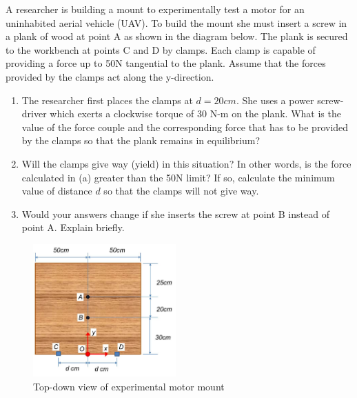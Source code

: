 
A researcher is building a mount to experimentally test a motor for an uninhabited aerial vehicle (UAV).
To build the mount she must insert a screw in a plank of wood at point A as shown in the diagram 
below. The plank is secured to the workbench at points C and D by clamps. Each clamp is capable of
providing a force up to 50N tangential to the plank. Assume that the forces provided by the clamps act along
the y-direction.

\begin{enumerate}
  \item The researcher first places the clamps at $d = 20 cm$. She uses a power screw-driver which exerts a clockwise
torque of 30 N-m on the plank. What is the value of the force couple and the corresponding force that
has to be provided by the clamps so that the plank remains in equilibrium?
  \item Will the clamps give way (yield) in this situation? In other words, is the force calculated in (a) greater
than the 50N limit? If so, calculate the minimum value of distance $d$ so that the clamps will not give way.
  \item Would your answers change if she inserts the screw at point B instead of point A. Explain briefly.
\end{enumerate}


\begin{figure}[ht!]
  \centering
  \includegraphics[height=2.0in]{fig.png}
  \caption*{Top-down view of experimental motor mount}
\end{figure}


